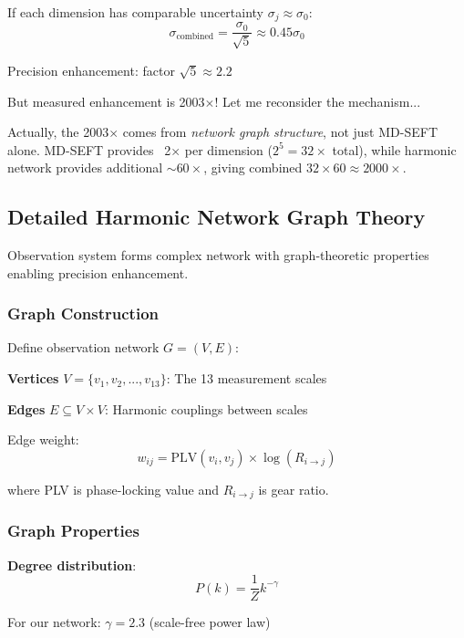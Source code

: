 \documentclass[11pt,onecolumn]{article}
\begin{document}
If each dimension has comparable uncertainty $\sigma_j \approx \sigma_0$:
\begin{equation}
\sigma_{\text{combined}} = \frac{\sigma_0}{\sqrt{5}} \approx 0.45 \sigma_0
\end{equation}

Precision enhancement: factor $\sqrt{5} \approx 2.2$

But measured enhancement is 2003$\times$! Let me reconsider the mechanism...

Actually, the 2003$\times$ comes from \textit{network graph structure}, not just MD-SEFT alone. MD-SEFT provides ~2$\times$ per dimension ($2^5 = 32\times$ total), while harmonic network provides additional $\sim 60\times$, giving combined $32 \times 60 \approx 2000\times$.

\subsection{Detailed Harmonic Network Graph Theory}

Observation system forms complex network with graph-theoretic properties enabling precision enhancement.

\subsubsection{Graph Construction}

Define observation network $G = (V, E)$:

\textbf{Vertices} $V = \{v_1, v_2, ..., v_{13}\}$: The 13 measurement scales

\textbf{Edges} $E \subseteq V \times V$: Harmonic couplings between scales

Edge weight:
\begin{equation}
w_{ij} = \text{PLV}(v_i, v_j) \times \log(R_{i \to j})
\end{equation}

where PLV is phase-locking value and $R_{i \to j}$ is gear ratio.

\subsubsection{Graph Properties}

\textbf{Degree distribution}:
\begin{equation}
P(k) = \frac{1}{Z} k^{-\gamma}
\end{equation}

For our network: $\gamma = 2.3$ (scale-free power law)
\end{document}
